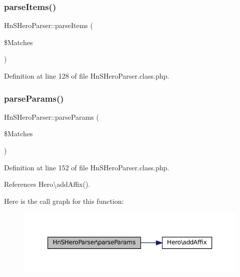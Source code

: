 \subsubsection{\texorpdfstring{parse\+Items()}{parseItems()}}
{\footnotesize\ttfamily Hn\+S\+Hero\+Parser\+::parse\+Items (\begin{DoxyParamCaption}\item[{}]{\$\+Matches }\end{DoxyParamCaption})\hspace{0.3cm}{\ttfamily [protected]}}



Definition at line 128 of file Hn\+S\+Hero\+Parser.\+class.\+php.

\mbox{\label{class_hn_s_hero_parser_adcd89614ad1fa41941418ae8ea5f0b1a}} 
\subsubsection{\texorpdfstring{parse\+Params()}{parseParams()}}
{\footnotesize\ttfamily Hn\+S\+Hero\+Parser\+::parse\+Params (\begin{DoxyParamCaption}\item[{}]{\$\+Matches }\end{DoxyParamCaption})\hspace{0.3cm}{\ttfamily [protected]}}



Definition at line 152 of file Hn\+S\+Hero\+Parser.\+class.\+php.



References Hero\textbackslash{}add\+Affix().

Here is the call graph for this function\+:\nopagebreak
\begin{figure}[H]
\begin{center}
\leavevmode
\includegraphics[width=350pt]{class_hn_s_hero_parser_adcd89614ad1fa41941418ae8ea5f0b1a_cgraph}
\end{center}
\end{figure}
\mbox{\label{class_hn_s_hero_parser_acef885d138ef4a0ad902150d968b60ef}} 
